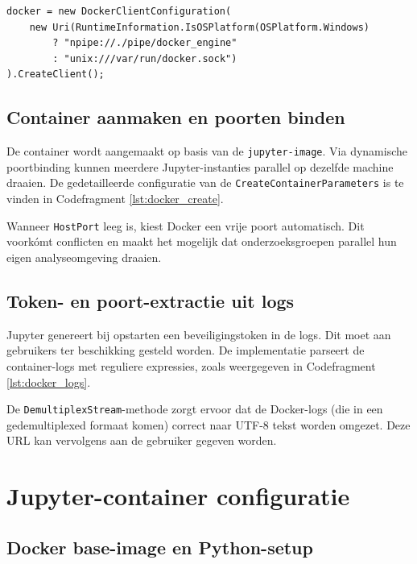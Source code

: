 \begin{listing}[ht]
\begin{verbatim}
docker = new DockerClientConfiguration(
    new Uri(RuntimeInformation.IsOSPlatform(OSPlatform.Windows)
        ? "npipe://./pipe/docker_engine"
        : "unix:///var/run/docker.sock")
).CreateClient();
\end{verbatim}
\caption{Initialisatie van de \texttt{DockerClient} voor verschillende platformen.}
\label{lst:docker_init}
\end{listing}

\subsection{Container aanmaken en poorten binden}

De container wordt aangemaakt op basis van de \texttt{jupyter-image}. Via dynamische poortbinding
kunnen meerdere Jupyter-instanties parallel op dezelfde machine draaien. De gedetailleerde configuratie van de \texttt{CreateContainerParameters} is te vinden in Codefragment \ref{lst:docker_create}.

Wanneer \texttt{HostPort} leeg is, kiest Docker een vrije poort automatisch. 
Dit voorkómt conflicten en maakt
het mogelijk dat onderzoeksgroepen parallel hun eigen analyseomgeving draaien.

\subsection{Token- en poort-extractie uit logs}

Jupyter genereert bij opstarten een beveiligingstoken in de logs. 
Dit moet aan gebruikers ter beschikking gesteld worden.
De implementatie parseert de container-logs met reguliere expressies, zoals weergegeven in Codefragment \ref{lst:docker_logs}.

De \texttt{DemultiplexStream}-methode zorgt ervoor dat de Docker-logs 
(die in een gedemultiplexed formaat komen)
correct naar UTF-8 tekst worden omgezet. Deze URL kan vervolgens aan de gebruiker gegeven worden.

\section{Jupyter-container configuratie}

\subsection{Docker base-image en Python-setup}

